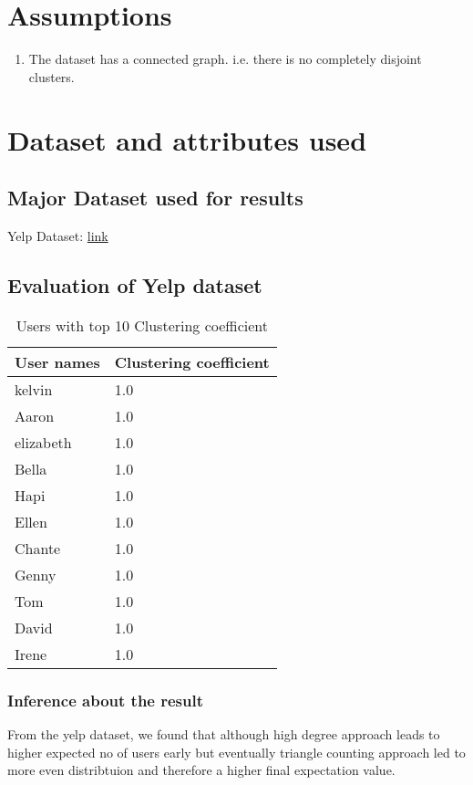 \documentclass[letterpaper,twocolumn,11pt]{article}
\begin{document}
\section{Assumptions}
\label{sec:assumptions}
\begin{enumerate}
\item The dataset has a connected graph. i.e. there is no completely disjoint clusters.
\end{enumerate}

\section{Dataset and attributes used}
\subsection{Major Dataset used for results}
Yelp Dataset: \href{http://www.yelp.com/dataset_challenge/}{link}


\subsection{Evaluation of Yelp dataset}


\begin{table*}[ht] 
\centering
\begin{tabular}{ |p{5cm}|p{3cm} |}
\hline
User names & Clustering coefficient\\ \hline
kelvin		&	1.0\\  \hline
Aaron		&	1.0\\  \hline
elizabeth	&	1.0\\  \hline
Bella		&	1.0\\  \hline
Hapi		&	1.0\\  \hline
Ellen		&	1.0\\  \hline
Chante 		&	1.0\\  \hline
Genny		&	1.0\\  \hline
Tom			&	1.0\\  \hline
David		&	1.0\\  \hline
Irene		&	1.0\\   \hline
\end{tabular}
\caption{Users with top 10 Clustering coefficient} 
\label{tab:cctop10} 
\end{table*} 




\subsubsection{Inference about the result}
From the yelp dataset, we found that although high degree approach leads to higher expected no of users early but eventually triangle counting approach led to more even distribtuion and therefore a higher final expectation value.
\end{document}
